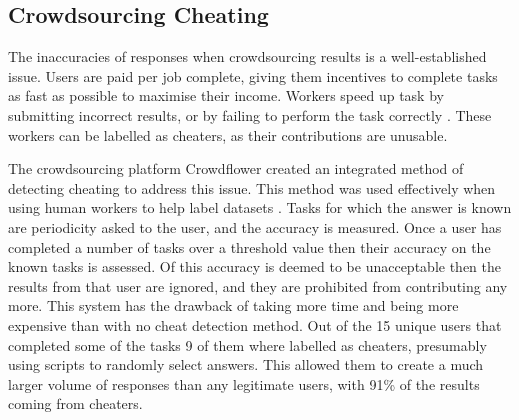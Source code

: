 \documentclass{article}
\begin{document}

\subsection{Crowdsourcing Cheating}



The inaccuracies of responses when crowdsourcing results is a well-established issue.
Users are paid per job complete, giving them incentives to complete tasks as fast as possible to maximise their income.
Workers speed up task by submitting incorrect results, or by failing to perform the task correctly \cite{hirth2013analyzing}.
These workers can be labelled as cheaters, as their contributions are unusable.


The crowdsourcing platform Crowdflower created an integrated method of detecting cheating to address this issue.
This method was used effectively when using human workers to help label datasets \cite{quinn2010crowdflow}.
Tasks for which the answer is known are periodicity asked to the user, and the accuracy is measured.
Once a user has completed a number of tasks over a threshold value then their accuracy on the known tasks is assessed.
Of this accuracy is deemed to be unacceptable then the results from that user are ignored, and they are prohibited from contributing any more.
This system has the drawback of taking more time and being more expensive than with no cheat detection method.
Out of the 15 unique users that completed some of the tasks 9 of them where labelled as cheaters, presumably using scripts to randomly select answers.
This allowed them to create a much larger volume of responses than any legitimate users, with 91\% of the results coming from cheaters.
\end{document}
